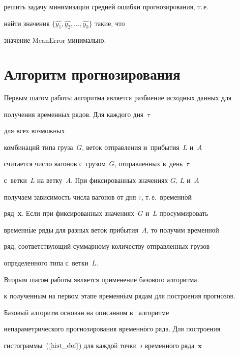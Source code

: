 решить задачу минимизации средней ошибки прогнозирования, т.\,е.\


найти значения $\{\hat{y_1}, \hat{y_2}, \ldots ,\hat{y_k}\}$ такие, что


значение $\text{MeanError}$ минимально.








\section{Алгоритм прогнозирования}





Первым шагом работы алгоритма является разбиение исходных данных для


получения временн$\acute{\mbox{ы}}$х рядов. Для каждого дня~$\tau$


для всех возможных


комбинаций типа груза~$G$, веток отправления и~прибытия~$L$ и~$A$


считается число вагонов с~грузом~$G$, отправленных в~день~$\tau$


с~ветки~$L$ на ветку~$A$. При фиксированных значениях $G$, $L$ и~$A$


получаем зависимость числа вагонов от дня $\tau$, т.\,е.\ временн$\acute{\mbox{о}}$й


ряд~\textbf{x}. Если при фиксированных значениях~$G$ и~$L$ просуммировать


временн$\acute{\mbox{ы}}$е ряды для разных веток прибытия~$A$, то получим временной


ряд, соответствующий суммарному количеству отправленных грузов


определенного типа с~ветки~$L$.





Вторым шагом работы является применение базового алгоритма


к полученным на первом этапе временн$\acute{\mbox{ы}}$м рядам для построения прогнозов.


Базовый алгоритм основан на описанном в~\cite{Valkov2012NP} алгоритме


непараметрического прогнозирования вре\-мен\-н$\acute{\mbox{о}}$го ряда. Для построения


гистограммы~($\ref{hist_def}$) для каждой точки~$i$ временн$\acute{\mbox{о}}$го ряда~$\mathbf{x}$



